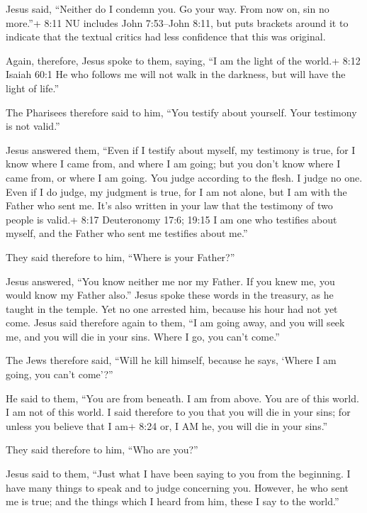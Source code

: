 Jesus said, ``Neither do I condemn you. Go your way. From now on, sin no
more.''+ 8:11 NU includes John 7:53--John 8:11, but puts brackets around
it to indicate that the textual critics had less confidence that this
was original.

 Again, therefore, Jesus spoke to them, saying, ``I am the
light of the world.+ 8:12 Isaiah 60:1 He who follows me will not walk in
the darkness, but will have the light of life.''

 The Pharisees therefore said to him, ``You testify about
yourself. Your testimony is not valid.''

 Jesus answered them, ``Even if I testify about myself, my
testimony is true, for I know where I came from, and where I am going;
but you don't know where I came from, or where I am going. 
You judge according to the flesh. I judge no one.  Even if
I do judge, my judgment is true, for I am not alone, but I am with the
Father who sent me.  It's also written in your law that the
testimony of two people is valid.+ 8:17 Deuteronomy 17:6; 19:15
 I am one who testifies about myself, and the Father who
sent me testifies about me.''

 They said therefore to him, ``Where is your Father?''

Jesus answered, ``You know neither me nor my Father. If you knew me, you
would know my Father also.''  Jesus spoke these words in
the treasury, as he taught in the temple. Yet no one arrested him,
because his hour had not yet come.  Jesus said therefore
again to them, ``I am going away, and you will seek me, and you will die
in your sins. Where I go, you can't come.''

 The Jews therefore said, ``Will he kill himself, because
he says, `Where I am going, you can't come'?''

 He said to them, ``You are from beneath. I am from above.
You are of this world. I am not of this world.  I said
therefore to you that you will die in your sins; for unless you believe
that I am+ 8:24 or, I AM he, you will die in your sins.''

 They said therefore to him, ``Who are you?''

Jesus said to them, ``Just what I have been saying to you from the
beginning.  I have many things to speak and to judge
concerning you. However, he who sent me is true; and the things which I
heard from him, these I say to the world.''

